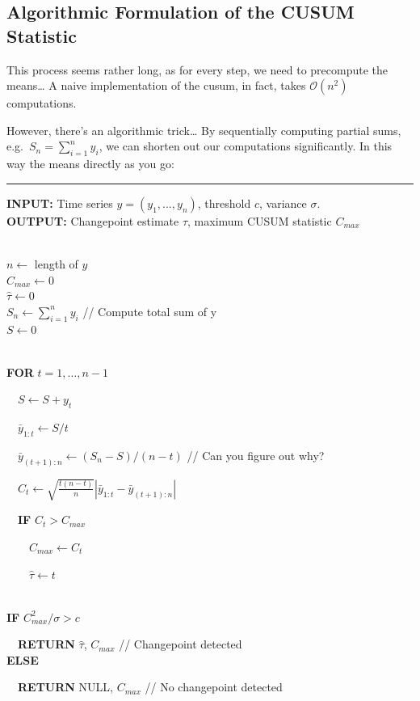 \documentclass[
  letterpaper,
  DIV=11,
  numbers=noendperiod]{scrreprt}
\begin{document}
\subsection{Algorithmic Formulation of the CUSUM
Statistic}\label{algorithmic-formulation-of-the-cusum-statistic}

This process seems rather long, as for every step, we need to precompute
the means\ldots{} A naive implementation of the cusum, in fact, takes
\(\mathcal{O}(n^2)\) computations.

However, there's an algorithmic trick\ldots{} By sequentially computing
partial sums, e.g.~\(S_n = \sum_{i=1}^n y_i\), we can shorten out our
computations significantly. In this way the means directly as you go:

\begin{center}\rule{0.5\linewidth}{0.5pt}\end{center}

\textbf{INPUT:} Time series \(y = (y_1, ..., y_n)\), threshold \(c\),
variance \(\sigma\).\\
\textbf{OUTPUT:} Changepoint estimate \(\hat{\tau}\), maximum CUSUM
statistic \(C_{max}\)\\
\strut \\
\(n \leftarrow\) length of \(y\)\\
\(C_{max} \leftarrow 0\)\\
\(\hat{\tau} \leftarrow 0\)\\
\(S_n \leftarrow \sum_{i=1}^n y_i\) // Compute total sum of y\\
\(S \leftarrow 0\)\\
\strut \\
\textbf{FOR} \(t = 1, \dots, n - 1\)\\
\strut ~~\(S \leftarrow S + y_t\)\\
\strut ~~\(\bar{y}_{1:t} \leftarrow S / t\)\\
\strut ~~\(\bar{y}_{(t+1):n} \leftarrow (S_n - S) / (n - t)\) // Can you
figure out why?\\
\strut ~~\(C_t \leftarrow \sqrt{\frac{t(n-t)}{n}} |\bar{y}_{1:t} - \bar{y}_{(t+1):n}|\)\\
\strut ~~\textbf{IF} \(C_t > C_{max}\)\\
\strut ~~~~\(C_{max} \leftarrow C_t\)\\
\strut ~~~~\(\hat{\tau} \leftarrow t\)\\
\strut \\
\textbf{IF} \(C_{max}^2 / \sigma > c\)\\
\strut ~~\textbf{RETURN} \(\hat{\tau}\), \(C_{max}\) // Changepoint
detected\\
\textbf{ELSE}\\
\strut ~~\textbf{RETURN} NULL, \(C_{max}\) // No changepoint detected
\end{document}
